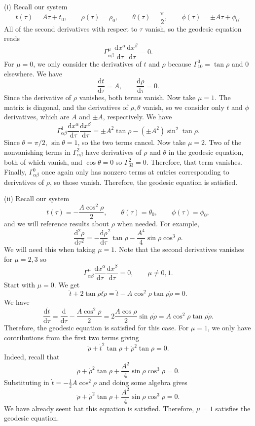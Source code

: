 \documentclass[11pt, letterpaper]{article}
\theoremstyle{plain}
\begin{document}
(i) Recall our system
\[
	t(\tau )=A\tau +t_0,\qquad \rho (\tau )=\rho _0,\qquad \theta (\tau )=\frac{\pi }{2} ,\qquad \phi (\tau )=\pm A\tau +\phi _0
.\]
All of the second derivatives with respect to $\tau $ vanish, so the geodesic equation reads
\[
	\Gamma_{\alpha \beta } ^\mu \frac{\mathrm{d}x^\alpha }{\mathrm{d}\tau } \frac{\mathrm{d}x^\beta }{\mathrm{d}\tau } =0
.\]
For $\mu =0$, we only consider the derivatives of $t$ and $\rho $ because $\Gamma^0_{10} =\tan \rho $ and 0 elsewhere. We have
\[
	\frac{\mathrm{d}t}{\mathrm{d}\tau } =A,\qquad \frac{\mathrm{d}\rho }{\mathrm{d}\tau } =0
.\]
Since the derivative of $\rho $ vanishes, both terms vanish. Now take $\mu =1$. The matrix is diagonal, and the derivatives of $\rho ,\theta $ vanish, so we consider only $t$ and $\phi $ derivatives, which are $A$ and $\pm A$, respectively. We have
\[
	\Gamma^1_{\alpha \beta } \frac{\mathrm{d}x^\alpha }{\mathrm{d}\tau } \frac{\mathrm{d}x^\beta }{\mathrm{d}\tau } =\pm A^2 \tan \rho -(\pm A^2) \sin ^2 \tan \rho 
.\]
Since $\theta =\pi /2$, $\sin \theta =1$, so the two terms cancel. Now take $\mu =2$. Two of the nonvanishing terms in $\Gamma^2_{\alpha \beta } $ have derivatives of $\rho $ and $\theta $ in the geodesic equation, both of which vanish, and $\cos \theta =0$ so $\Gamma^2_{33} =0$. Therefore, that term vanishes. Finally, $\Gamma^0_{\alpha \beta } $ once again only has nonzero terms at entries corresponding to derivatives of $\rho $, so those vanish. Therefore, the geodesic equation is satisfied.


(ii) Recall our system
\[
	t(\tau )=-\frac{A \cos ^2\rho }{2},\qquad \theta (\tau )=\theta _0,\qquad \phi (\tau )=\phi _0,
\]
and we will reference results about $\rho $ when needed. For example,
\[
	\frac{\mathrm{d}^2\rho }{\mathrm{d}\tau ^2} =-\frac{\mathrm{d}\rho }{\mathrm{d}\tau } ^2 \tan \rho -\frac{A^4}{4} \sin \rho \cos ^3 \rho 
.\]
We will need this when taking $\mu =1$. Note that the second derivatives vanishes for $\mu =2,3$ so
\[
	\Gamma ^\mu_{\alpha \beta } \frac{\mathrm{d}x^\alpha }{\mathrm{d}\tau } \frac{\mathrm{d}x^\beta }{\mathrm{d}\tau } =0,\qquad \mu \neq 0,1
.\]
Start with $\mu =0$. We get
\[
	\ddot{t} +2 \tan \rho \dot{t} \dot{\rho } =\ddot{t} -A \cos ^2\rho \tan \rho \dot{\rho } =0
.\]
We have
\[
	\frac{\mathrm{d}\dot{t} }{\mathrm{d}\tau } =\frac{\mathrm{d}}{\mathrm{d}\tau } -\frac{A \cos ^2\rho }{2} =2\frac{A \cos \rho }{2} \sin \rho \dot{\rho } =A \cos ^2\rho \tan \rho \dot{\rho } 
.\]
Therefore, the geodesic equation is satisfied for this case. For $\mu =1$, we only have contributions from the first two terms giving
\[
	\ddot{\rho } + \dot{t}^2 \tan \rho +\dot{\rho } ^2 \tan \rho =0 
.\]
Indeed, recall that
\[
	\ddot{\rho } +\dot{\rho } ^2 \tan \rho +\frac{A^2}{4} \sin \rho \cos ^3\rho =0
.\]
Substituting in $\dot{t} =-\frac{1}{2} A \cos ^2\rho $ and doing some algebra gives
\[
	\ddot{\rho } +\dot{\rho } ^2 \tan \rho +\frac{A^2}{4} \sin \rho \cos ^3\rho =0
.\]
We have already seent hat this equation is satisfied. Therefore, $\mu =1$ satisfies the geodesic equation.
\end{document}

